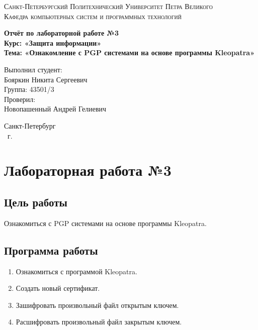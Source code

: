 \documentclass[14pt,a4paper,report]{report}
\begin{document}
\def\contentsname{Содержание}

\begin{titlepage}
	\begin{center}
		\textsc{Санкт-Петербургский Политехнический 
			Университет Петра Великого\\[5mm]
			Кафедра компьютерных систем и программных технологий}
		
		\vfill
		
		\textbf{Отчёт по лабораторной работе №3\\[3mm]
			Курс: «Защита информации»\\[6mm]
			Тема: «Ознакомление с PGP системами на основе программы Kleopatra»\\[35mm]
		}
	\end{center}
	
	\hfill
	\begin{minipage}{.5\textwidth}
		Выполнил студент:\\[2mm] 
		Бояркин Никита Сергеевич\\
		Группа: 43501/3\\[5mm]
		
		Проверил:\\[2mm] 
		Новопашенный Андрей Гелиевич
	\end{minipage}
	\vfill
	\begin{center}
		Санкт-Петербург\\ \the\year\ г.
	\end{center}
\end{titlepage}

\tableofcontents
\clearpage

\chapter{Лабораторная работа №3}

\section{Цель работы}

Ознакомиться с PGP системами на основе программы Kleopatra.

\section{Программа работы}

\begin{enumerate}
	\item Ознакомиться с программой Kleopatra.
	\item Создать новый сертификат.
	\item Зашифровать произвольный файл открытым ключем.
	\item Расшифровать произвольный файл закрытым ключем.
\end{enumerate}
\end{document}
